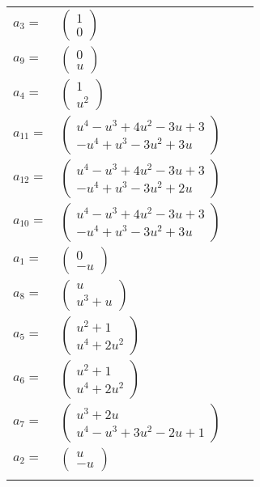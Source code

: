 \documentclass[1p]{elsarticle_modified}
\theoremstyle{definition}
\begin{document}
\begin{tabular}{m{7pt} m{180pt} m{7pt} m{180pt} }
\flushright $a_{3}=$&$\begin{pmatrix}1\\0\end{pmatrix}$ \\
\flushright $a_{9}=$&$\begin{pmatrix}0\\u\end{pmatrix}$ \\
\flushright $a_{4}=$&$\begin{pmatrix}1\\u^2\end{pmatrix}$ \\
\flushright $a_{11}=$&$\begin{pmatrix}u^4- u^3+4 u^2-3 u+3\\- u^4+u^3-3 u^2+3 u\end{pmatrix}$ \\
\flushright $a_{12}=$&$\begin{pmatrix}u^4- u^3+4 u^2-3 u+3\\- u^4+u^3-3 u^2+2 u\end{pmatrix}$ \\
\flushright $a_{10}=$&$\begin{pmatrix}u^4- u^3+4 u^2-3 u+3\\- u^4+u^3-3 u^2+3 u\end{pmatrix}$ \\
\flushright $a_{1}=$&$\begin{pmatrix}0\\- u\end{pmatrix}$ \\
\flushright $a_{8}=$&$\begin{pmatrix}u\\u^3+u\end{pmatrix}$ \\
\flushright $a_{5}=$&$\begin{pmatrix}u^2+1\\u^4+2 u^2\end{pmatrix}$ \\
\flushright $a_{6}=$&$\begin{pmatrix}u^2+1\\u^4+2 u^2\end{pmatrix}$ \\
\flushright $a_{7}=$&$\begin{pmatrix}u^3+2 u\\u^4- u^3+3 u^2-2 u+1\end{pmatrix}$ \\
\flushright $a_{2}=$&$\begin{pmatrix}u\\- u\end{pmatrix}$\\&\end{tabular}
\end{document}
